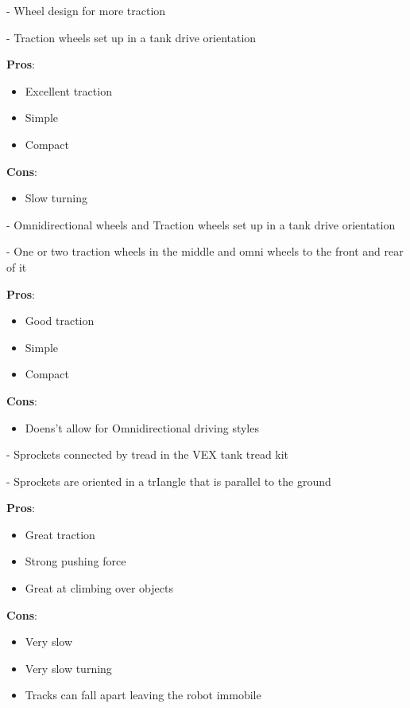 
- Wheel design for more traction

- Traction wheels set up in a tank drive orientation 

\noindent
\textbf{Pros}:
\begin{itemize}
    \item  Excellent traction
    \item Simple
    \item Compact 
\end{itemize}
\textbf{Cons}:
\begin{itemize}

    \item Slow turning
\end{itemize}


- Omnidirectional wheels and Traction wheels set up in a tank drive orientation 

- One or two traction wheels in the middle and omni wheels to the front and rear of it 

\noindent
\textbf{Pros}:
\begin{itemize}
    \item Good traction
    \item Simple
    \item Compact 
\end{itemize}
\textbf{Cons}:
\begin{itemize}
    \item Doens't allow for Omnidirectional driving styles
\end{itemize}


- Sprockets connected by tread in the VEX
tank tread kit

- Sprockets are oriented in a trIangle that is parallel
to the ground

\noindent
\textbf{Pros}:
\begin{itemize}
    \item Great traction
    \item Strong pushing force
    \item Great at climbing over objects 
\end{itemize}
\textbf{Cons}:
\begin{itemize}
    \item Very slow
    \item Very slow turning 
    \item Tracks can fall apart leaving the robot immobile
\end{itemize}

